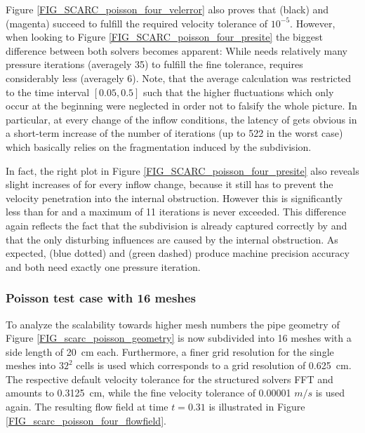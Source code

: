 Figure \ref{FIG_SCARC_poisson_four_velerror} also proves that
\ffttight{} (black) and \scarctight{} (magenta) succeed to fulfill the required velocity tolerance of $10^{-5}$. 
However, when looking to Figure \ref{FIG_SCARC_poisson_four_presite} the biggest difference between both solvers becomes apparent: While \ffttight{} needs relatively many pressure iterations (averagely 35) to fulfill the fine tolerance, \scarctight{} requires considerably less (averagely 6). 
Note, that the average calculation was restricted to the time interval $[0.05,0.5]$ such that the higher fluctuations which only occur
at the beginning were neglected in order not to falsify the whole picture.
In particular, at every change of the inflow conditions, the latency of \ffttight{} gets obvious in a short-term increase of the number of iterations (up to 522 in the worst case) which basically relies on the fragmentation induced by the subdivision. 

In fact, the right plot in Figure \ref{FIG_SCARC_poisson_four_presite} also reveals slight increases of \scarctight{} for every inflow change, because it still has to prevent the velocity penetration into the internal obstruction. However this is significantly less than for \ffttight{} and a maximum of 11 iterations is never exceeded.
This difference again reflects the fact that the subdivision is already captured correctly by \scarc{} and that the only disturbing influences are caused by the internal obstruction.
%
As expected, \uglmat{} (blue dotted) and \uscarc{} (green dashed)
produce machine precision accuracy and both need exactly one pressure iteration.



\subsubsection{Poisson test case with 16 meshes}
\label{SEC_SCARC_poisson_sixteen}

To analyze the scalability towards higher mesh numbers the pipe geometry of Figure \ref{FIG_scarc_poisson_geometry} is now subdivided into 16 meshes with a side length of 20~cm  each. Furthermore, a finer grid resolution for the single meshes into $32^2$ cells is used which corresponds to a grid resolution of 0.625~cm. The respective default velocity tolerance for the structured solvers FFT and \scarc{} amounts to 0.3125~cm, while the fine velocity tolerance of 0.00001 $m/s$ is used again.
The resulting flow field at time $t=0.31$ is illustrated in Figure \ref{FIG_scarc_poisson_four_flowfield}.


